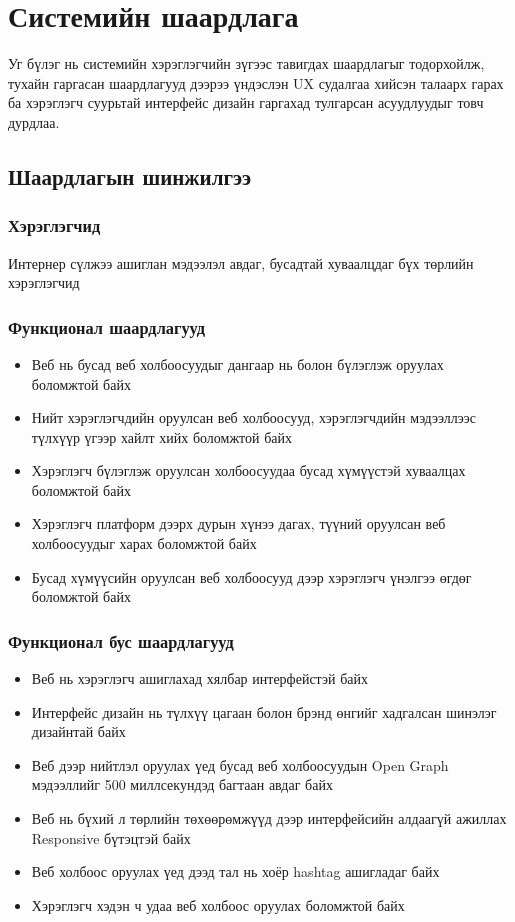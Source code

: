 \chapter{Системийн шаардлага}

Уг бүлэг нь системийн хэрэглэгчийн зүгээс тавигдах шаардлагыг тодорхойлж, тухайн гаргасан шаардлагууд дээрээ үндэслэн UX судалгаа хийсэн талаарх гарах ба хэрэглэгч суурьтай интерфейс дизайн гаргахад тулгарсан асуудлуудыг товч дурдлаа.

\section{Шаардлагын шинжилгээ}

\subsection{Хэрэглэгчид}

Интернер сүлжээ ашиглан мэдээлэл авдаг, бусадтай хуваалцдаг бүх төрлийн хэрэглэгчид

\subsection{Функционал шаардлагууд}

\begin{itemize}
	\item Веб нь бусад веб холбоосуудыг дангаар нь болон бүлэглэж оруулах боломжтой байх
	\item Нийт хэрэглэгчдийн оруулсан веб холбоосууд, хэрэглэгчдийн мэдээллээс түлхүүр үгээр хайлт хийх боломжтой байх
	\item Хэрэглэгч бүлэглэж оруулсан холбоосуудаа бусад хүмүүстэй хуваалцах боломжтой байх
	\item Хэрэглэгч платформ дээрх дурын хүнээ дагах, түүний оруулсан веб холбоосуудыг харах боломжтой байх
	\item Бусад хүмүүсийн оруулсан веб холбоосууд дээр хэрэглэгч үнэлгээ өгдөг боломжтой байх
\end{itemize}

\subsection{Функционал бус шаардлагууд}

\begin{itemize}
	\item Веб нь хэрэглэгч ашиглахад хялбар интерфейстэй байх
	\item Интерфейс дизайн нь түлхүү цагаан болон брэнд өнгийг хадгалсан шинэлэг дизайнтай байх
	\item Веб дээр нийтлэл оруулах үед бусад веб холбоосуудын Open Graph мэдээллийг 500 миллсекундэд багтаан авдаг байх
	\item Веб нь бүхий л төрлийн төхөөрөмжүүд дээр интерфейсийн алдаагүй ажиллах Responsive бүтэцтэй байх
	\item Веб холбоос оруулах үед дээд тал нь хоёр hashtag ашигладаг байх
	\item Хэрэглэгч хэдэн ч удаа веб холбоос оруулах боломжтой байх
\end{itemize}


